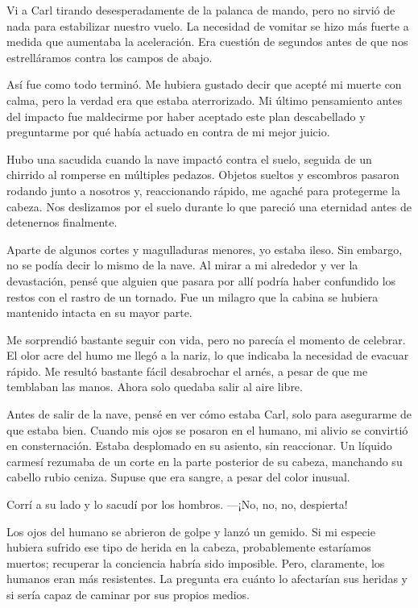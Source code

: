 Vi a Carl tirando desesperadamente de la palanca de mando, pero no sirvió de nada para estabilizar nuestro vuelo. La necesidad de vomitar se hizo más fuerte a medida que aumentaba la aceleración. Era cuestión de segundos antes de que nos estrelláramos contra los campos de abajo.

Así fue como todo terminó. Me hubiera gustado decir que acepté mi muerte con calma, pero la verdad era que estaba aterrorizado. Mi último pensamiento antes del impacto fue maldecirme por haber aceptado este plan descabellado y preguntarme por qué había actuado en contra de mi mejor juicio.

Hubo una sacudida cuando la nave impactó contra el suelo, seguida de un chirrido al romperse en múltiples pedazos. Objetos sueltos y escombros pasaron rodando junto a nosotros y, reaccionando rápido, me agaché para protegerme la cabeza. Nos deslizamos por el suelo durante lo que pareció una eternidad antes de detenernos finalmente.

Aparte de algunos cortes y magulladuras menores, yo estaba ileso. Sin embargo, no se podía decir lo mismo de la nave. Al mirar a mi alrededor y ver la devastación, pensé que alguien que pasara por allí podría haber confundido los restos con el rastro de un tornado. Fue un milagro que la cabina se hubiera mantenido intacta en su mayor parte.

Me sorprendió bastante seguir con vida, pero no parecía el momento de celebrar. El olor acre del humo me llegó a la nariz, lo que indicaba la necesidad de evacuar rápido. Me resultó bastante fácil desabrochar el arnés, a pesar de que me temblaban las manos. Ahora solo quedaba salir al aire libre.

Antes de salir de la nave, pensé en ver cómo estaba Carl, solo para asegurarme de que estaba bien. Cuando mis ojos se posaron en el humano, mi alivio se convirtió en consternación. Estaba desplomado en su asiento, sin reaccionar. Un líquido carmesí rezumaba de un corte en la parte posterior de su cabeza, manchando su cabello rubio ceniza. Supuse que era sangre, a pesar del color inusual.

Corrí a su lado y lo sacudí por los hombros. —¡No, no, no, despierta!

Los ojos del humano se abrieron de golpe y lanzó un gemido. Si mi especie hubiera sufrido ese tipo de herida en la cabeza, probablemente estaríamos muertos; recuperar la conciencia habría sido imposible. Pero, claramente, los humanos eran más resistentes. La pregunta era cuánto lo afectarían sus heridas y si sería capaz de caminar por sus propios medios.

